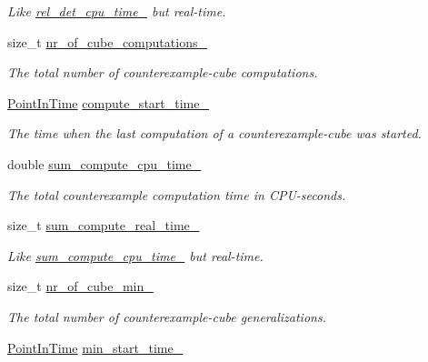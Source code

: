 \begin{DoxyCompactItemize}
\begin{DoxyCompactList}\small\item\em Like \hyperlink{classLearnStatisticsQBF_a38d959613268b6a6aa0decfcbe5d631c}{rel\-\_\-det\-\_\-cpu\-\_\-time\-\_\-} but real-\/time. \end{DoxyCompactList}\item 
size\-\_\-t \hyperlink{classLearnStatisticsQBF_a857dac1670c551b3dcf935860651143b}{nr\-\_\-of\-\_\-cube\-\_\-computations\-\_\-}
\begin{DoxyCompactList}\small\item\em The total number of counterexample-\/cube computations. \end{DoxyCompactList}\item 
\hyperlink{Stopwatch_8h_af3a9f634f27bed7e98dbc23e5c6f807d}{Point\-In\-Time} \hyperlink{classLearnStatisticsQBF_a820d051dbab21cb8df1ad673b04a0c92}{compute\-\_\-start\-\_\-time\-\_\-}
\begin{DoxyCompactList}\small\item\em The time when the last computation of a counterexample-\/cube was started. \end{DoxyCompactList}\item 
double \hyperlink{classLearnStatisticsQBF_a4caf75f422eed77570e5592ce35c9bd0}{sum\-\_\-compute\-\_\-cpu\-\_\-time\-\_\-}
\begin{DoxyCompactList}\small\item\em The total counterexample computation time in C\-P\-U-\/seconds. \end{DoxyCompactList}\item 
size\-\_\-t \hyperlink{classLearnStatisticsQBF_aceb8e32bfd42839f2c19d3b12e7eb888}{sum\-\_\-compute\-\_\-real\-\_\-time\-\_\-}
\begin{DoxyCompactList}\small\item\em Like \hyperlink{classLearnStatisticsQBF_a4caf75f422eed77570e5592ce35c9bd0}{sum\-\_\-compute\-\_\-cpu\-\_\-time\-\_\-} but real-\/time. \end{DoxyCompactList}\item 
size\-\_\-t \hyperlink{classLearnStatisticsQBF_aff417981063fbdf94164ce7b2d1e71a2}{nr\-\_\-of\-\_\-cube\-\_\-min\-\_\-}
\begin{DoxyCompactList}\small\item\em The total number of counterexample-\/cube generalizations. \end{DoxyCompactList}\item 
\hyperlink{Stopwatch_8h_af3a9f634f27bed7e98dbc23e5c6f807d}{Point\-In\-Time} \hyperlink{classLearnStatisticsQBF_a929ae751d1bbb728f96132e5ee6d99fa}{min\-\_\-start\-\_\-time\-\_\-}

\end{DoxyCompactItemize}
